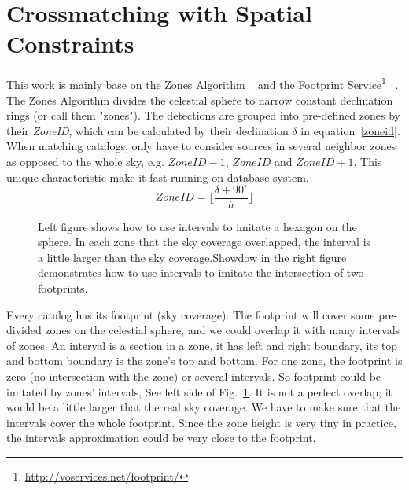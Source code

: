 \section{Crossmatching with Spatial Constraints}
This work is mainly base on the Zones Algorithm ~\citep{DBLP:journals/corr/abs-cs-0701171} and the Footprint Service\footnote{\url{http://voservices.net/footprint/}} ~\citep{2007ASPC..376..559B}. The Zones Algorithm divides the celestial sphere to narrow constant declination rings (or call them "zones"). The detections are grouped into pre-defined zones by their \textit{ZoneID}, which can be calculated by their declination $\delta$ in equation~\ref{zoneid}. When matching catalogs, only have to consider sources in several neighbor zones as opposed to the whole sky, e.g. $ZoneID-1$, $ZoneID$ and $ZoneID+1$. This unique characteristic make it fast running on database system.
\begin{equation}\label{zoneid}
ZoneID=\lfloor{\frac{\delta + 90^\circ}{h}}\rfloor
\end{equation}

\begin{figure}
\begin{center}
\caption{{Left figure shows how to use intervals to imitate a hexagon on the sphere. In each zone that the sky coverage overlapped, the interval is a little larger than the sky coverage.}{Showdow in the right figure demonstrates how to use intervals to imitate the intersection of two footprints.}\label{P046_f2}}
\end{center}
\end{figure}

Every catalog has its footprint (sky coverage). The footprint will cover some pre-divided zones on the celestial sphere, and we could overlap it with many intervals of zones. An interval is a section in a zone, it has left and right boundary, its top and bottom boundary is the zone's top and bottom. For one zone, the footprint is zero (no intersection with the zone) or several intervals. So footprint could be imitated by zones' intervals, See left side of Fig.~\ref{P046_f2}. It is not a perfect overlap; it would be a little larger that the real sky coverage. We have to make sure that the intervals cover the whole footprint. Since the zone height is very tiny in practice, the intervals approximation could be very close to the footprint.

